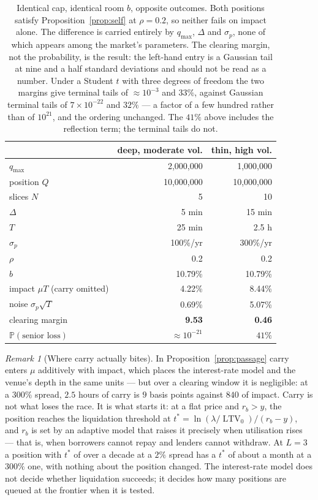\documentclass[11pt,a4paper]{article}
\theoremstyle{plain}
\theoremstyle{definition}
\theoremstyle{remark}
\newtheorem{remark}[proposition]{Remark}
\DeclareMathOperator{\ltv}{LTV}
\begin{document}
\begin{table}[h]\centering
\begin{tabular}{lrr}
\toprule
& \textbf{deep, moderate vol.} & \textbf{thin, high vol.} \\
\midrule
$q_{\max}$ & 2{,}000{,}000 & 1{,}000{,}000 \\
position $Q$ & 10{,}000{,}000 & 10{,}000{,}000 \\
slices $N$ & 5 & 10 \\
$\Delta$ & 5 min & 15 min \\
$T$ & 25 min & 2.5 h \\
$\sigma_p$ & 100\%/yr & 300\%/yr \\
$\rho$ & 0.2 & 0.2 \\
\midrule
$b$ & 10.79\% & 10.79\% \\
impact $\mu T$ (carry omitted) & 4.22\% & 8.44\% \\
noise $\sigma_p\sqrt T$ & 0.69\% & 5.07\% \\
clearing margin & \textbf{9.53} & \textbf{0.46} \\
$\mathbb{P}(\text{senior loss})$ & ${\approx}10^{-21}$ & $41\%$ \\
\bottomrule
\end{tabular}
\caption{Identical cap, identical room $b$, opposite outcomes. Both positions satisfy
Proposition~\ref{prop:self} at $\rho=0.2$, so neither fails on impact alone. The difference is
carried entirely by $q_{\max}$, $\Delta$ and $\sigma_p$, none of which appears among the market's
parameters. The clearing margin, not the probability, is the result: the left-hand entry is a
Gaussian tail at nine and a half standard deviations and should not be read as a number. Under a
Student $t$ with three degrees of freedom the two margins give terminal tails of
${\approx}10^{-3}$ and $33\%$, against Gaussian terminal tails of $7\times10^{-22}$ and $32\%$ ---
a factor of a few hundred rather than of $10^{21}$, and the ordering unchanged. The $41\%$ above
includes the reflection term; the terminal tails do not.}
\end{table}

\begin{remark}[Where carry actually bites]
In Proposition~\ref{prop:passage} carry enters $\mu$ additively with impact, which places the
interest-rate model and the venue's depth in the same units --- but over a clearing window it is
negligible: at a $300\%$ spread, $2.5$ hours of carry is $9$ basis points against $840$ of impact.
Carry is not what loses the race. It is what starts it: at a flat price and $r_b>y$, the position
reaches the liquidation threshold at $t^{*}=\ln(\lambda/\ltv_0)/(r_b-y)$, and $r_b$ is set by an
adaptive model that raises it precisely when utilisation rises --- that is, when borrowers cannot
repay and lenders cannot withdraw. At $L=3$ a position with $t^{*}$ of over a decade at a $2\%$
spread has a $t^{*}$ of about a month at a $300\%$ one, with nothing about the position changed.
The interest-rate model does not decide whether liquidation succeeds; it decides how many
positions are queued at the frontier when it is tested.
\end{remark}
\end{document}
